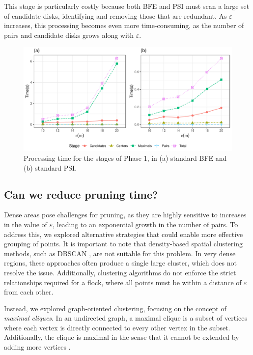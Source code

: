 This stage is particularly costly because both BFE and PSI must scan a large set of candidate disks, identifying and removing those that are redundant. As $\varepsilon$ increases, this processing becomes even more time-consuming, as the number of pairs and candidate disks grows along with $\varepsilon$.

\begin{figure}
    \centering
    \includegraphics[width=\linewidth] {chapter4/figures/plots/09_dense_stages/dense.pdf} 
    \caption{Processing time for the stages of Phase 1, in (a) standard BFE and (b) standard  PSI.}\label{fig:dense_stages}
\end{figure}

\subsection{Can we reduce pruning time?}
Dense areas pose challenges for pruning, as they are highly sensitive to increases in the value of $\varepsilon$, leading to an exponential growth in the number of pairs. To address this, we explored alternative strategies that could enable more effective grouping of points. It is important to note that density-based spatial clustering methods, such as DBSCAN \cite{dbscan}, are not suitable for this problem. In very dense regions, these approaches often produce a single large cluster, which does not resolve the issue. Additionally, clustering algorithms do not enforce the strict relationships required for a flock, where all points must be within a distance of $\varepsilon$ from each other.

Instead, we explored graph-oriented clustering, focusing on the concept of \textit{maximal cliques}. In an undirected graph, a maximal clique is a subset of vertices where each vertex is directly connected to every other vertex in the subset. Additionally, the clique is maximal in the sense that it cannot be extended by adding more vertices \cite{tomita_clique_2013, bron_algorithm_1973}.

